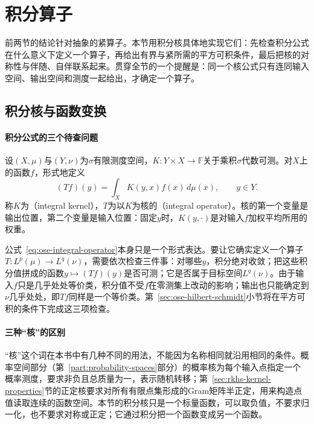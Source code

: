 
\section{积分算子}
\label{sec:ose-integral-operators}

前两节的结论针对抽象的紧算子。本节用积分核具体地实现它们：先检查积分公式在什么意义下定义一个算子，再给出有界与紧所需的平方可积条件，最后把核的对称性与伴随、自伴联系起来。贯穿全节的一个提醒是：同一个核公式只有连同输入空间、输出空间和测度一起给出，才确定一个算子。

\subsection{积分核与函数变换}
\label{sec:ose-kernels}

\paragraph{积分公式的三个待查问题}
设$(X,\mu)$与$(Y,\nu)$为$\sigma$有限测度空间，$K:Y\times X\to\mathbb F$关于乘积$\sigma$代数可测。对$X$上的函数$f$，形式地定义
\begin{equation}
  (Tf)(y)=\int_XK(y,x)f(x)\,d\mu(x),\qquad y\in Y .
  \label{eq:ose-integral-operator}
\end{equation}
称$K$为（integral kernel），$T$为以$K$为核的（integral operator）。核的第一个变量是输出位置，第二个变量是输入位置：固定$y$时，$K(y,\cdot)$是对输入$f$加权平均所用的权重。

公式~\eqref{eq:ose-integral-operator}本身只是一个形式表达。要让它确实定义一个算子$T:L^p(\mu)\to L^q(\nu)$，需要依次检查三件事：对哪些$y$，积分绝对收敛；把这些积分值拼成的函数$y\mapsto(Tf)(y)$是否可测；它是否属于目标空间$L^q(\nu)$。由于输入$f$只是几乎处处等价类，积分值不受$f$在零测集上改动的影响；输出也只能确定到$\nu$几乎处处，即$Tf$同样是一个等价类。第~\ref{sec:ose-hilbert-schmidt}小节将在平方可积的条件下完成这三项检查。

\paragraph{三种“核”的区别}
“核”这个词在本书中有几种不同的用法，不能因为名称相同就沿用相同的条件。概率空间部分（第~\ref{part:probability-spaces}部分）的概率核为每个输入点指定一个概率测度，要求非负且总质量为一，表示随机转移；第~\ref{sec:rkhs-kernel-properties}节的正定核要求对所有有限点集形成的Gram矩阵半正定，用来构造点值读取连续的函数空间。本节的积分核只是一个标量函数，可以取负值，不要求归一化，也不要求对称或正定；它通过积分把一个函数变成另一个函数。

